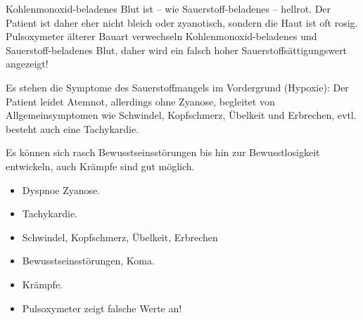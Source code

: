 {
Kohlenmonoxid-beladenes Blut ist -- wie
Sauerstoff-beladenes -- hellrot. Der Patient ist
daher eher nicht bleich oder zyanotisch, sondern
die Haut ist oft rosig. Pulsoxymeter älterer Bauart
verwechseln Kohlenmonoxid-beladenes und Sauerstoff-beladenes Blut, daher wird ein falsch hoher Sauerstoffsättigungswert angezeigt!

Es stehen die Symptome des Sauerstoffmangels im Vordergrund
(Hypoxie): Der Patient leidet Atemnot, allerdings ohne
Zyanose, begleitet von Allgemeinsymptomen wie Schwindel,
Kopfschmerz, Übelkeit und Erbrechen, evtl. besteht auch eine
Tachykardie. 

Es können sich rasch Bewusstseinsstörungen bis hin zur
Bewusstlosigkeit entwickeln, auch Krämpfe sind gut möglich.
}{
\begin{itemize}
  \item Dyspnoe    Zyanose.
  \item Tachykardie.
  \item Schwindel, Kopfschmerz, Übelkeit, Erbrechen
  \item Bewusstseinsstörungen, Koma.
  \item Krämpfe.
  \item Pulsoxymeter zeigt falsche Werte an!
\end{itemize}
}{}{}{}




% 

